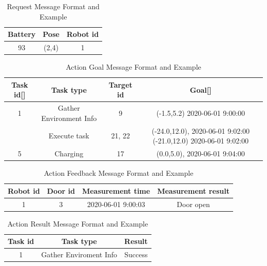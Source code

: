 \begin{table}[htb]
\centering
\begin{tabular}{|c|c|c|} 
\hline
Battery & Pose & Robot id\\
\hline\hline
93	&(2,4)	&1 \\ [1ex] 
\hline
\end{tabular}
\caption{Request Message Format and Example}
\label{tab:request_message}
\end{table}

\begin{table}[htb]
\centering
\begin{tabular}{|c|c|c|c|} 
\hline
Task id[] &Task type & Target id & Goal[] \\
\hline\hline
1& Gather Environment Info & 9	& (-1.5,5.2) 2020-06-01 9:00:00 \\
\hline
[3,4]	& Execute task & 21, 22	& (-24.0,12.0), 2020-06-01 9:02:00 (-21.0,12.0) 2020-06-01 9:02:00 \\
\hline
5	& Charging	& 17	&(0.0,5.0), 2020-06-01 9:04:00 \\ [1ex] 
\hline
\end{tabular}
\caption{Action Goal Message Format and Example}
\label{tab:goal_message}
\end{table}

\begin{table}[htb]
\centering
\begin{tabular}{|c|c|c|c|} 
\hline
Robot id & Door id & Measurement time & Measurement result \\
\hline\hline
1	& 3	& 2020-06-01 9:00:03 & Door open \\ [1ex] 
\hline
\end{tabular}
\caption{Action Feedback Message Format and Example}
\label{tab:feedback_message}
\end{table}

\begin{table}[htb]
\centering
\begin{tabular}{|c|c|c|} 
\hline
Task id	& Task type	& Result\\
\hline\hline
1 & Gather Enviroment Info & Success \\ [1ex] 
\hline
\end{tabular}
\caption{Action Result Message Format and Example}
\label{tab:result_message}
\end{table}







